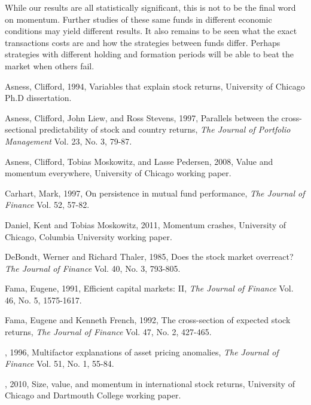 \documentclass[12pt]{article}
\begin{document}
While our results are all statistically significant, this is not to be the final word on momentum. Further studies of these same funds in different economic conditions may yield different results. It also remains to be seen what the exact transactions costs are and how the strategies between funds differ. Perhaps strategies with different holding and formation periods will be able to beat the market when others fail.


\newpage \begin{thebibliography}{100} %

 Asness, Clifford, 1994, Variables that explain stock returns, University of Chicago Ph.D dissertation.

 Asness, Clifford, John Liew, and Ross Stevens, 1997, Parallels between the cross-sectional predictability of stock and country returns, \emph{The Journal of Portfolio Management} Vol. 23, No. 3, 79-87.

 Asness, Clifford, Tobias Moskowitz, and Lasse Pedersen, 2008, Value and momentum everywhere, University of Chicago working paper.

 Carhart, Mark, 1997, On persistence in mutual fund performance, \emph{The Journal of Finance} Vol. 52, 57-82.

 Daniel, Kent and Tobias Moskowitz, 2011, Momentum crashes, University of Chicago, Columbia University working paper.

 DeBondt, Werner and Richard Thaler, 1985, Does the stock market overreact? \emph{The Journal of Finance} Vol. 40, No. 3, 793-805.

 Fama, Eugene, 1991, Efficient capital markets: II, \emph{The Journal of Finance} Vol. 46, No. 5, 1575-1617.

 Fama, Eugene and Kenneth French, 1992, The cross-section of expected stock returns, \emph{The Journal of Finance} Vol. 47, No. 2, 427-465.

 \underline{\hspace{1cm}}, 1996, Multifactor explanations of asset pricing anomalies, \emph{The Journal of Finance} Vol. 51, No. 1, 55-84.

 \underline{\hspace{1cm}}, 2010, Size, value, and momentum in international stock returns, University of Chicago and Dartmouth College working paper.


\end{thebibliography}
\end{document}
